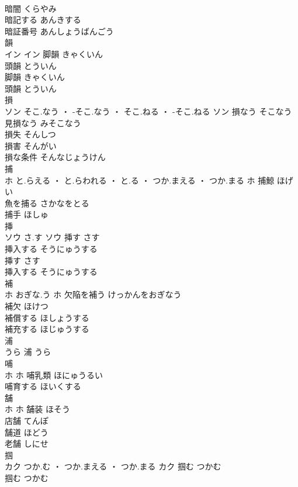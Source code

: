 \documentclass[8pt]{extreport}
\begin{document}
\begin{CJK}{UTF8}{min}
\\	暗闇	くらやみ	
\\	暗記する	あんきする	
\\	暗証番号	あんしょうばんごう	
\\	韻	
\\	イン		イン	脚韻	きゃくいん	
\\	頭韻	とういん	
\\	脚韻	きゃくいん	
\\	頭韻	とういん	
\\	損	
\\	ソン	そこ.なう ・ -そこ.なう ・ そこ.ねる ・ -そこ.ねる	ソン	損なう	そこなう	
\\	見損なう	みそこなう	
\\	損失	そんしつ	
\\	損害	そんがい	
\\	損な条件	そんなじょうけん	
\\	捕	
\\	ホ	と.らえる ・ と.らわれる ・ と.る ・ つか.まえる ・ つか.まる	ホ	捕鯨	ほげい	
\\	魚を捕る	さかなをとる	
\\	捕手	ほしゅ	
\\	挿	
\\	ソウ	さ.す	ソウ	挿す	さす	
\\	挿入する	そうにゅうする	
\\	挿す	さす	
\\	挿入する	そうにゅうする	
\\	補	
\\	ホ	おぎな.う	ホ	欠陥を補う	けっかんをおぎなう	
\\	補欠	ほけつ	
\\	補償する	ほしょうする	
\\	補充する	ほじゅうする	
\\	浦	
\\	うら														浦	うら	
\\	哺	
\\	ホ		ホ	哺乳類	ほにゅうるい	
\\	哺育する	ほいくする	
\\	舗	
\\	ホ		ホ	舗装	ほそう	
\\	店舗	てんぽ	
\\	舗道	ほどう	
\\	老舗	しにせ	
\\	掴	
\\	カク	つか.む ・ つか.まえる ・ つか.まる	カク	掴む	つかむ	
\\	掴む	つかむ	

\end{CJK}
\end{document}
